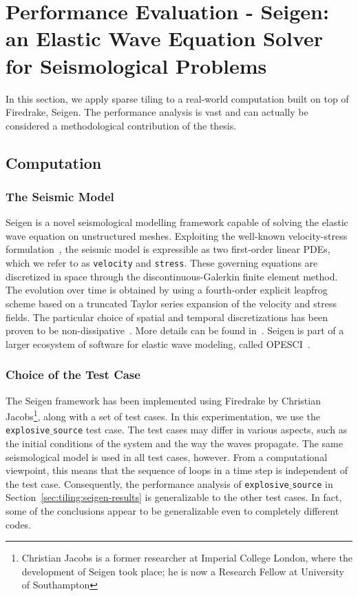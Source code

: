 \section{Performance Evaluation - Seigen: an Elastic Wave Equation Solver for Seismological Problems}
\label{sec:tiling:seigen}
In this section, we apply sparse tiling to a real-world computation built on top of Firedrake, Seigen. The performance analysis is vast and can actually be considered a methodological contribution of the thesis.

\subsection{Computation}
\label{sec:tiling:seigen:comp}

\subsubsection{The Seismic Model}
Seigen is a novel seismological modelling framework capable of solving the elastic wave equation on unstructured meshes. Exploiting the well-known velocity-stress formulation~\citep{Seigen-3}, the seismic model is expressible as two first-order linear PDEs, which we refer to as {\tt velocity} and {\tt stress}. These governing equations are discretized in space through the discontinuous-Galerkin finite element method. The evolution over time is obtained by using a fourth-order explicit leapfrog scheme based on a truncated Taylor series expansion of the velocity and stress fields. The particular choice of spatial and temporal discretizations has been proven to be non-dissipative~\citep{Seigen-1}. More details can be found in~\cite{Seigen-paper}. Seigen is part of a larger ecosystem of software for elastic wave modeling, called OPESCI~\citep{opesci-project}. 

\subsubsection{Choice of the Test Case}
The Seigen framework has been implemented using Firedrake by Christian Jacobs\footnote{Christian Jacobs is a former researcher at Imperial College London, where the development of Seigen took place; he is now a Research Fellow at University of Southampton}, along with a set of test cases. In this experimentation, we use the {\tt explosive$\_$source} test case. The test cases may differ in various aspects, such as the initial conditions of the system and the way the waves propagate. The same seismological model is used in all test cases, however. From a computational viewpoint, this means that the sequence of loops in a time step is independent of the test case. Consequently, the performance analysis of {\tt explosive$\_$source} in Section~\ref{sec:tiling:seigen-results} is generalizable to the other test cases. In fact, some of the conclusions appear to be generalizable even to completely different codes. 

